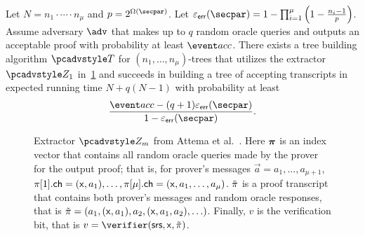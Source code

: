   \begin{lemma}\label{lem:attema}
	Let $N = n_1 \cdot \cdots \cdot n_\mu$ and $p = 2^{\Omega(\secpar)}$. Let $\epserr(\secpar) = 1 - \prod_{i=1}^{\mu}\left(1 - \frac{n_i - 1}{p}\right)$.
	Assume adversary $\adv$ that makes up to $q$ random
	oracle queries and outputs an acceptable proof with probability at least
	$\accProb$. There exists a tree building algorithm $\tdv$ for $(n_1, \ldots, n_\mu)$-trees that utilizes the extractor $\zdv_1$ in~\cref{fig:Attema-ext} and succeeds in building a
	tree of accepting transcripts in expected
	running time $N + q (N - 1)$ with probability at least
	\[
	\frac{\accProb - (q + 1) \epserr (\secpar)}{1 - \epserr (\secpar)}.
	\]
	\end{lemma}

\begin{figure}[t]
	\centering
	\caption{Extractor $\zdv_m$ from Attema et al.~\cite{EPRINT:AttFehKlo21}. Here $\vec{\zkproof}$ is an index vector that contains all random oracle queries made by the prover for the output proof; that is, for prover's messages $\vec{a} = a_1, \ldots, a_{\mu + 1}$, $\pi[1].\mathsf{ch} = (\mathsf{x}, a_1), \ldots, \pi[{\mu}].\mathsf{ch} = (\mathsf{x}, a_1, \ldots, a_\mu)$.  $\tilde{\pi}$ is a proof transcript that contains both prover's messages and random oracle responses, that is $\tilde{\pi} = (a_1, (\mathsf{x}, a_1), a_2, (\mathsf{x}, a_1, a_2), \ldots)$. Finally, $v$ is the verification bit, that is $v = \verifier (\srs, \inp, \tzkproof)$. }
	\label{fig:Attema-ext}
\end{figure} 


